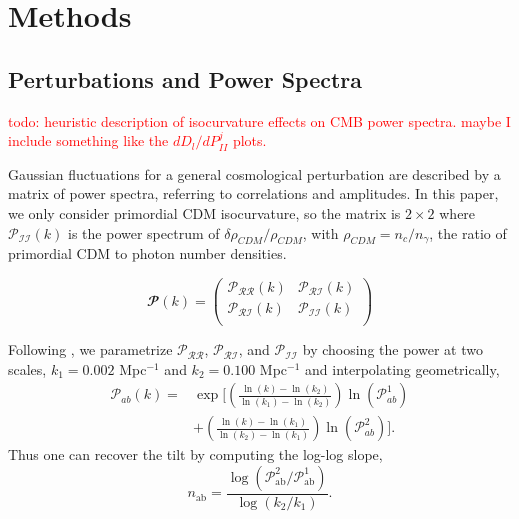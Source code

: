 \documentclass{emulateapj}
\newcommand\writingnote[1]{\textcolor{red}{#1}}
\newcommand\prr{ \mathcal{P}_{\mathcal{R}\mathcal{R}} }
\newcommand\pri{ \mathcal{P}_{\mathcal{R}\mathcal{I}} }
\newcommand\pii{ \mathcal{P}_{\mathcal{I}\mathcal{I}} }
\begin{document}
\section{Methods}


\subsection{Perturbations and Power Spectra}

\writingnote{
todo: heuristic description of isocurvature effects on CMB power spectra. maybe I include something like the $dD_l/dP_{II}^j$ plots.
}


Gaussian fluctuations for a general cosmological perturbation are described by a matrix of power spectra, referring to correlations and amplitudes. In this paper, we only consider primordial CDM isocurvature, so the matrix is $2 \times 2$ where $\pii(k)$ is the power spectrum of $\delta \rho_{CDM} / \rho_{CDM}$, with $\rho_{CDM} = n_c / n_{\gamma}$, the ratio of primordial CDM to photon number densities.

\begin{equation}
\mathbfcal{P}(k) = \left( {\begin{array}{cc}
   \prr(k) & \pri(k) \\
   \pri(k) &  \pii(k) \\
  \end{array} } \right)
\end{equation}

Following \cite{planckXX:2015}, we parametrize $\prr$, $\pri$, and $\pii$ by choosing the power at two scales, $k_1 = 0.002$ Mpc$^{-1}$ and $k_2 = 0.100$ Mpc$^{-1}$ and interpolating geometrically,
\begin{align*}
\mathcal{P}_{ab}(k) = & \exp \bigg[ \left( \frac{\ln(k) - \ln(k_2)}{\ln(k_1) - \ln(k_2)}\right) \ln \left( \mathcal{P}_{ab}^1 \right) \\
& +
\left( \frac{\ln(k) - \ln(k_1)}{\ln(k_2) - \ln(k_1)}\right) \ln \left( \mathcal{P}_{ab}^2 \right) \bigg].
\end{align*}
Thus one can recover the tilt by computing the log-log slope,
\begin{equation} n_{\text{ab}}  =  \frac{\log( \mathcal{P}_{\text{ab}}^2 / \mathcal{P}_{\text{ab}}^1 )}{\log ( k_2 / k_1 )}. \end{equation}
\end{document}
